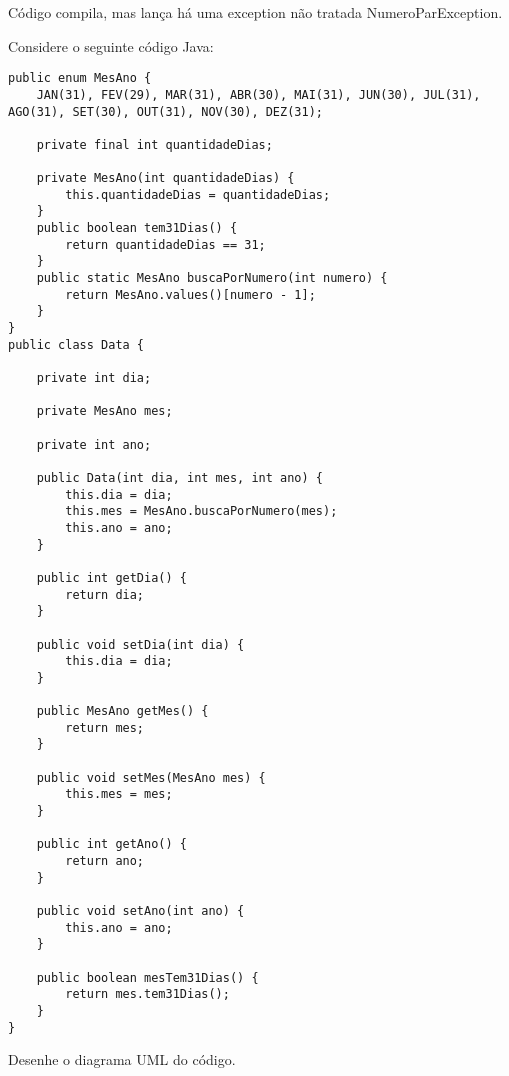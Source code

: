 \documentclass{lib/eng_softdoc}
\begin{document}
\answer Código compila, mas lança há uma exception não tratada NumeroParException.   

\problem Considere o seguinte código Java: 

\vspace{0.5cm}
\begin{lstlisting}
public enum MesAno {
	JAN(31), FEV(29), MAR(31), ABR(30), MAI(31), JUN(30), JUL(31), AGO(31), SET(30), OUT(31), NOV(30), DEZ(31);

	private final int quantidadeDias;

	private MesAno(int quantidadeDias) {
		this.quantidadeDias = quantidadeDias;
	}
	public boolean tem31Dias() {
		return quantidadeDias == 31;
	}
	public static MesAno buscaPorNumero(int numero) {
		return MesAno.values()[numero - 1];
	}
}
public class Data {

	private int dia;

	private MesAno mes;

	private int ano;

	public Data(int dia, int mes, int ano) {
		this.dia = dia;
		this.mes = MesAno.buscaPorNumero(mes);
		this.ano = ano;
	}

	public int getDia() {
		return dia;
	}

	public void setDia(int dia) {
		this.dia = dia;
	}

	public MesAno getMes() {
		return mes;
	}

	public void setMes(MesAno mes) {
		this.mes = mes;
	}

	public int getAno() {
		return ano;
	}

	public void setAno(int ano) {
		this.ano = ano;
	}

	public boolean mesTem31Dias() {
		return mes.tem31Dias();
	}
}
\end{lstlisting}
\subproblem Desenhe o diagrama UML do código.  

\answer
\end{document}
